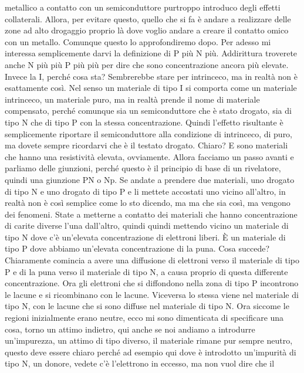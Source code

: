{metallico a contatto con un semiconduttore purtroppo introduco degli effetti collaterali. Allora, per evitare questo, quello che si fa è andare a realizzare delle zone ad alto drogaggio proprio là dove voglio andare a creare il contatto omico con un metallo. Comunque questo lo approfondiremo dopo. Per adesso mi interessa semplicemente darvi la definizione di P più N più. Addirittura troverete anche N più più P più più per dire che sono concentrazione ancora più elevate. Invece la I, perché cosa sta? Sembrerebbe stare per intrinceco, ma in realtà non è esattamente così. Nel senso un materiale di tipo I si comporta come un materiale intrinceco, un materiale puro, ma in realtà prende il nome di materiale compensato, perché comunque sia un semiconduttore che è stato drogato, sia di tipo N che di tipo P con la stessa concentrazione. Quindi l'effetto risultante è semplicemente riportare il semiconduttore alla condizione di intrinceco, di puro, ma dovete sempre ricordarvi che è il testato drogato. Chiaro? E sono materiali che hanno una resistività elevata, ovviamente. Allora facciamo un passo avanti e parliamo delle giunzioni, perché questo è il principio di base di un rivelatore, quindi una giunzione PN o Np. Se andate a prendere due materiali, uno drogato di tipo N e uno drogato di tipo P e li mettete accostati uno vicino all'altro, in realtà non è così semplice come lo sto dicendo, ma ma che sia così, ma vengono dei fenomeni. State a metterne a contatto dei materiali che hanno concentrazione di carite diverse l'una dall'altro, quindi quindi mettendo vicino un materiale di tipo N dove c'è un'elevata concentrazione di elettroni liberi. È un materiale di tipo P dove abbiamo un'elevata concentrazione di la puna. Cosa succede? Chiaramente comincia a avere una diffusione di elettroni verso il materiale di tipo P e di la puna verso il materiale di tipo N, a causa proprio di questa differente concentrazione. Ora gli elettroni che si diffondono nella zona di tipo P incontrono le lacune e si ricombinano con le lacune. Viceversa lo stessa viene nel materiale di tipo N, con le lacune che si sono diffuse nel materiale di tipo N. Ora siccome le regioni inizialmente erano neutre, ecco mi sono dimenticata di specificare una cosa, torno un attimo indietro, qui anche se noi andiamo a introdurre un'impurezza, un attimo di tipo diverso, il materiale rimane pur sempre neutro, questo deve essere chiaro perché ad esempio qui dove è introdotto un'impurità di tipo N, un donore, vedete c'è l'elettrono in eccesso, ma non vuol dire che il 

}

